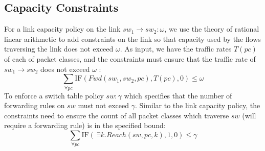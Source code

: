 

\subsection{Capacity Constraints} \label{sec:linkcap}
For a link capacity policy on the link $sw_1 \rightarrow sw_2: \omega$, we use the theory of rational linear arithmetic to add constraints on the link so that capacity used by the flows traversing the link does not exceed $\omega$. As input, we have the traffic rates $T(pc)$ of
each of packet classes, and the constraints must ensure that the traffic rate of $sw_1 \rightarrow sw_2$
does not exceed $\omega$ :
\begin{equation}
 \sum_{\forall pc} \text{IF}(Fwd(sw_1,sw_2, pc), T(pc), 0) \leq \omega 
\end{equation}
To enforce a switch table policy $sw : \gamma$ which specifies that the number of forwarding 
rules on $sw$ must not exceed $\gamma$. Similar to the link capacity policy,
the constraints need to ensure the count of all packet classes which traverse $sw$ (will require 
a forwarding rule) is in the specified bound:
\begin{equation}
\sum_{\forall pc} \text{IF}(~\exists k. Reach(sw,pc,k), 1, 0)  \leq \gamma
\end{equation}

